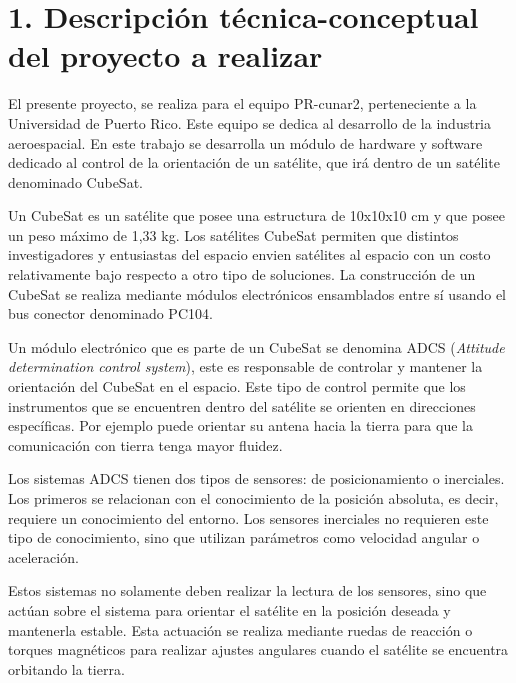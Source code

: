 \documentclass[
11pt, %
]{charter}
\begin{document}
\section{1. Descripción técnica-conceptual del proyecto a realizar}
\label{sec:descripcion}

El presente proyecto, se realiza para el equipo PR-cunar2, perteneciente a la Universidad de Puerto Rico. Este equipo se dedica al desarrollo de la industria aeroespacial. En este trabajo se desarrolla un módulo de hardware y software dedicado al control de la orientación de un satélite, que irá dentro de un satélite denominado CubeSat.

Un CubeSat es un satélite que posee una estructura de 10x10x10 cm y que posee un peso máximo de 1,33 kg. Los satélites CubeSat permiten que distintos investigadores y entusiastas del espacio envien satélites al espacio con un costo relativamente bajo respecto a otro tipo de soluciones. La construcción de un  CubeSat se realiza mediante módulos electrónicos ensamblados entre sí usando el bus conector denominado PC104. 

Un módulo electrónico que es parte de un CubeSat se denomina ADCS (\textit{Attitude determination control system}), este es responsable de controlar y mantener la orientación del CubeSat en el espacio. Este tipo de control  permite que los instrumentos que se encuentren dentro del satélite se orienten en direcciones específicas.  Por ejemplo puede orientar su antena hacia la tierra para que la comunicación con tierra tenga mayor fluidez. 

Los sistemas ADCS tienen dos tipos de sensores: de posicionamiento o inerciales. Los primeros se relacionan con el conocimiento de la posición absoluta, es decir, requiere un conocimiento del entorno. Los sensores inerciales no requieren este tipo de conocimiento, sino que utilizan parámetros como velocidad angular o aceleración. 

Estos sistemas no solamente deben realizar la lectura de los sensores, sino que actúan sobre el sistema para orientar el satélite en la posición deseada y mantenerla estable. Esta actuación se realiza mediante ruedas de reacción o torques magnéticos para realizar ajustes angulares cuando el satélite se encuentra orbitando la tierra.
\end{document}
